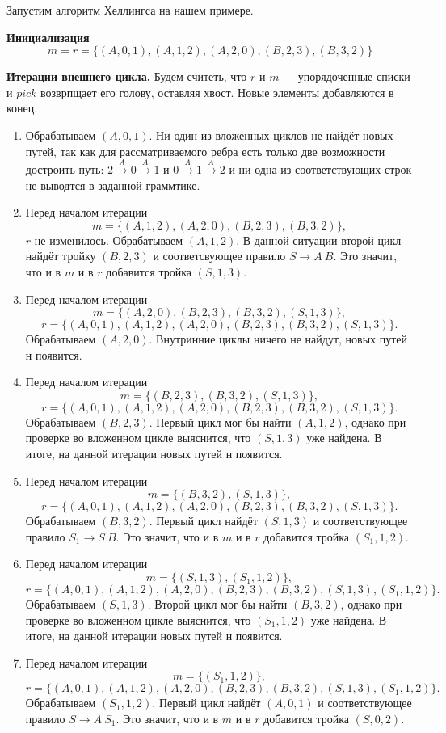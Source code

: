 \begin{example}
  Запустим алгоритм Хеллингса на нашем примере.
  
  \textbf{Инициализация}
  $$
  m = r = \{(A,0,1),(A,1,2),(A,2,0),(B,2,3),(B,3,2)\}
  $$
  
  \textbf{Итерации внешнего цикла.} Будем считеть, что $r$ и $m$ --- упорядоченные списки и $pick$ возврпщает его голову, оставляя хвост.
  Новые элементы добавляются в конец.
  \begin{enumerate}
  \item Обрабатываем $(A,0,1)$. 
  Ни один из вложенных циклов не найдёт новых путей, так как для рассматриваемого ребра есть только две возможности достроить путь: $2 \xrightarrow{A} 0 \xrightarrow{A} 1$ и $0 \xrightarrow{A} 1 \xrightarrow{A} 2$
  и ни одна из соответствующих строк не выводтся в заданной граммтике.
  \item Перед началом итерации 
     $$
     m = \{(A,1,2),(A,2,0),(B,2,3),(B,3,2)\},
     $$ $r$ не изменилось.
     Обрабатываем $(A,1,2)$.
     В данной ситуации второй цикл найдёт тройку $(B,2,3)$ и соответсвующее правило $S \to A \ B$. 
     Это значит, что и в $m$ и в $r$ добавится тройка $(S, 1, 3)$.
  \item
   Перед началом итерации 
     $$
     m = \{(A,2,0),(B,2,3),(B,3,2),(S,1,3)\},
     $$ 
     $$
     r= \{(A,0,1),(A,1,2),(A,2,0),(B,2,3),(B,3,2),(S,1,3)\}.
     $$
     Обрабатываем $(A,2,0)$. 
     Внутринние циклы ничего не найдут, новых путей н появится.
   \item
   Перед началом итерации 
     $$
     m = \{(B,2,3),(B,3,2),(S,1,3)\},
     $$ 
     $$
     r= \{(A,0,1),(A,1,2),(A,2,0),(B,2,3),(B,3,2),(S,1,3)\}.
     $$
     Обрабатываем $(B,2,3)$. 
     Первый цикл мог бы найти $(A,1,2)$, однако при проверке во вложенном цикле выяснится, что $(S, 1, 3)$ уже найдена. 
     В итоге, на данной итерации новых путей н появится.
   \item
   Перед началом итерации 
     $$
     m = \{(B,3,2),(S,1,3)\},
     $$ 
     $$
     r= \{(A,0,1),(A,1,2),(A,2,0),(B,2,3),(B,3,2),(S,1,3)\}.
     $$
     Обрабатываем $(B,3,2)$. 
     Первый цикл найдёт $(S,1,3)$ и соответствующее правило $S_1 \to S \ B$. 
     Это значит, что и в $m$ и в $r$ добавится тройка $(S_1, 1, 2)$. 
   \item
   Перед началом итерации 
     $$
     m = \{(S,1,3),(S_1, 1, 2)\},
     $$ 
     $$
     r= \{(A,0,1),(A,1,2),(A,2,0),(B,2,3),(B,3,2),(S,1,3),(S_1, 1, 2)\}.
     $$
     Обрабатываем $(S,1,3)$. 
     Второй цикл мог бы найти $(B,3,2)$, однако при проверке во вложенном цикле выяснится, что $(S_1, 1, 2)$ уже найдена. 
     В итоге, на данной итерации новых путей н появится.
   \item
   Перед началом итерации 
     $$
     m = \{(S_1, 1, 2)\},
     $$ 
     $$
     r= \{(A,0,1),(A,1,2),(A,2,0),(B,2,3),(B,3,2),(S,1,3),(S_1, 1, 2)\}.
     $$
     Обрабатываем $(S_1,1,2)$. 
     Первый цикл найдёт $(A,0,1)$ и соответствующее правило $S \to A \ S_1$. 
     Это значит, что и в $m$ и в $r$ добавится тройка $(S, 0, 2)$. 


\end{enumerate}
\end{example}
